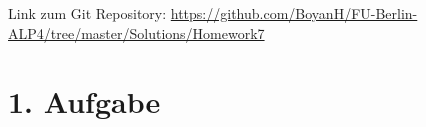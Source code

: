 \usepackage{graphicx}
\usepackage{amsmath}
\usepackage{amssymb}
\usepackage{fancyvrb}

\newcommand{\dozent}{Prof. Dr. Margarita Esponda}					%
\newcommand{\tutor}{Lilli Walter}						%
\newcommand{\tutoriumNo}{6}				%
\newcommand{\projectNo}{7}									%
\newcommand{\veranstaltung}{Nichtsequentielle Programmierung}	%
\newcommand{\semester}{SoeSe 2017}						%
\newcommand{\studenten}{Boyan Hristov, Sergelen Gongor}			%





Link zum Git Repository: \url{https://github.com/BoyanH/FU-Berlin-ALP4/tree/master/Solutions/Homework\projectNo}


\section*{1. Aufgabe}

